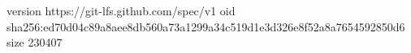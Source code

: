 version https://git-lfs.github.com/spec/v1
oid sha256:ed70d04c89a8aee8db560a73a1299a34c519d1e3d326e8f52a8a7654592850d6
size 230407
